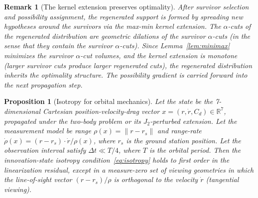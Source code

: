 \documentclass[12pt]{article}
\newtheorem{proposition}[theorem]{Proposition}
\newtheorem{remark}[theorem]{Remark}
\begin{document}
\begin{remark}[The kernel extension preserves optimality]
After survivor selection and possibility assignment, the regenerated support is formed by spreading new hypotheses around the survivors via the max-min kernel extension. The $\alpha$-cuts of the regenerated distribution are geometric dilations of the survivor $\alpha$-cuts (in the sense that they contain the survivor $\alpha$-cuts). Since Lemma~\ref{lem:minimax} minimizes the survivor $\alpha$-cut volumes, and the kernel extension is monotone (larger survivor cuts produce larger regenerated cuts), the regenerated distribution inherits the optimality structure. The possibility gradient is carried forward into the next propagation step.
\end{remark}

\begin{proposition}[Isotropy for orbital mechanics]
\label{prop:isotropy}
Let the state be the 7-dimensional Cartesian position-velocity-drag vector $x = (r, \dot{r}, C_d) \in \mathbb{R}^7$, propagated under the two-body problem or its $J_2$-perturbed extension. Let the measurement model be range $\rho(x) = \|r - r_s\|$ and range-rate $\dot{\rho}(x) = (r - r_s)\cdot\dot{r}/\rho(x)$, where $r_s$ is the ground station position. Let the observation interval satisfy $\Delta t \ll T/4$, where $T$ is the orbital period. Then the innovation-state isotropy condition~\eqref{eq:isotropy} holds to first order in the linearization residual, except in a measure-zero set of viewing geometries in which the line-of-sight vector $(r - r_s)/\rho$ is orthogonal to the velocity $\dot{r}$ (tangential viewing).
\end{proposition}
\end{document}
